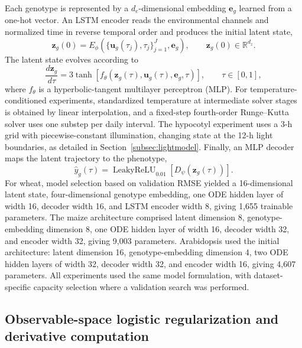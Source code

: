\documentclass[preprint,12pt,authoryear]{elsarticle}
\begin{document}
Each genotype is represented by a $d_e$-dimensional embedding $\mathbf e_g$ learned from a one-hot vector. An LSTM encoder reads the environmental channels and normalized time in reverse temporal order and produces the initial latent state,
\begin{equation}
 \mathbf z_g(0)=E_{\phi}\!\left(\{\mathbf u_g(\tau_j),\tau_j\}_{j=1}^{J},\mathbf e_g\right),
 \qquad \mathbf z_g(0)\in\mathbb R^{d_z}.
 \label{eq:encoder}
\end{equation}
The latent state evolves according to
\begin{equation}
 \frac{d\mathbf z_g}{d\tau}
 =3\tanh\!\left[f_{\theta}\!\left(\mathbf z_g(\tau),\mathbf u_g(\tau),\mathbf e_g,\tau\right)\right],
 \qquad \tau\in[0,1],
 \label{eq:ode}
\end{equation}
where $f_{\theta}$ is a hyperbolic-tangent multilayer perceptron (MLP). For temperature-conditioned experiments, standardized temperature at intermediate solver stages is obtained by linear interpolation, and a fixed-step fourth-order Runge--Kutta solver uses one substep per daily interval. The hypocotyl experiment uses a 3-h grid with piecewise-constant illumination, changing state at the 12-h light boundaries, as detailed in Section~\ref{subsec:lightmodel}. Finally, an MLP decoder maps the latent trajectory to the phenotype,
\begin{equation}
 \hat y_g(\tau)=\operatorname{LeakyReLU}_{0.01}\!\left[D_{\psi}(\mathbf z_g(\tau))\right].
 \label{eq:decoder}
\end{equation}
For wheat, model selection based on validation RMSE yielded a 16-dimensional latent state, four-dimensional genotype embedding, one ODE hidden layer of width 16, decoder width 16, and LSTM encoder width 8, giving 1,655 trainable parameters. The maize architecture comprised latent dimension 8, genotype-embedding dimension 8, one ODE hidden layer of width 16, decoder width 32, and encoder width 32, giving 9,003 parameters. Arabidopsis used the initial architecture: latent dimension 16, genotype-embedding dimension 4, two ODE hidden layers of width 32, decoder width 32, and encoder width 16, giving 4,607 parameters. All experiments used the same model formulation, with dataset-specific capacity selection where a validation search was performed.

\subsection{Observable-space logistic regularization and derivative computation}
\end{document}
